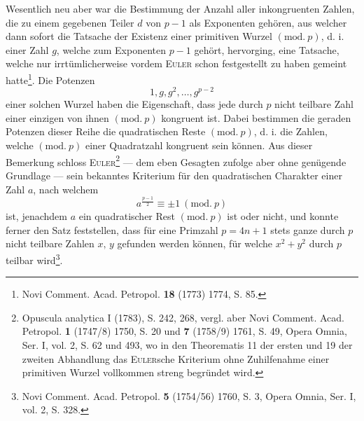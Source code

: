 Wesentlich neu aber war die Bestimmung der Anzahl aller inkongruenten Zahlen, die zu einem gegebenen Teiler \(d\) von \(p-1\) als Exponenten gehören, aus welcher dann sofort die Tatsache der Existenz einer primitiven Wurzel \((\mathrm{mod.}\ p)\), d. i. einer Zahl \(g\), welche zum Exponenten \(p-1\) gehört, hervorging, eine Tatsache, welche nur irrtümlicherweise vordem \textsc{Euler} schon festgestellt zu haben gemeint hatte\begingroup\renewcommand{\thefootnote}{†)}\footnote{Novi Comment. Acad. Petropol. \textbf{18} (1773) 1774, S. 85.}\endgroup. Die Potenzen
\[
1,g,g^2,\ldots,g^{p-2}
\]
\clearpage{}
\noindent einer solchen Wurzel haben die Eigenschaft, dass jede durch \(p\) nicht teilbare Zahl einer einzigen von ihnen \((\mathrm{mod.}\ p)\) kongruent ist. Dabei bestimmen die geraden Potenzen dieser Reihe die quadratischen Reste \((\mathrm{mod.}\ p)\), d. i. die Zahlen, welche \((\mathrm{mod.}\ p)\) einer Quadratzahl kongruent sein können. Aus dieser Bemerkung schloss \textsc{Euler}\footnote{Opuscula analytica I (1783), S. 242, 268, vergl. aber Novi Comment. Acad. Petropol. \textbf{1} (1747/8) 1750, S. 20 und \textbf{7} (1758/9) 1761, S. 49, Opera Omnia, Ser. I, vol. 2, S. 62 und 493, wo in den Theorematis 11 der ersten und 19 der zweiten Abhandlung das \textsc{Euler}sche Kriterium ohne Zuhilfenahme einer primitiven Wurzel vollkommen streng begründet wird.} — dem eben Gesagten zufolge aber ohne genügende Grundlage — sein bekanntes Kriterium für den quadratischen Charakter einer Zahl \(a\), nach welchem
\[
a^{\frac{p-1}{2}}\equiv\pm1\ (\mathrm{mod.}\ p)
\]
ist, jenachdem \(a\) ein quadratischer Rest \((\mathrm{mod.}\ p)\) ist oder nicht, und konnte ferner den Satz feststellen, dass für eine Primzahl \(p=4n+1\) stets ganze durch \(p\) nicht teilbare Zahlen \(x,\,y\) gefunden werden können, für welche \(x^2+y^2\) durch \(p\) teilbar wird\begingroup\renewcommand{\thefootnote}{**)}\footnote{Novi Comment. Acad. Petropol. \textbf{5} (1754/56) 1760, S. 3, Opera Omnia, Ser. I, vol. 2, S. 328.}\endgroup.

